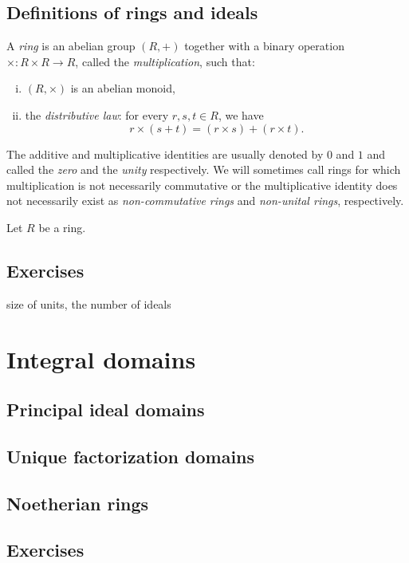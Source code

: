 \documentclass{../../large}
\begin{document}
\section{Definitions of rings and ideals}
\begin{prb}
A \emph{ring} is an abelian group $(R,+)$ together with a binary operation $\times:R\times R\to R$, called the \emph{multiplication}, such that:
\begin{enumerate}[(i)]
\item $(R,\times)$ is an abelian monoid,
\item the \emph{distributive law}: for every $r,s,t\in R$, we have
\[r\times(s+t)=(r\times s)+(r\times t).\]
\end{enumerate}
The additive and multiplicative identities are usually denoted by $0$ and $1$ and called the \emph{zero} and the \emph{unity} respectively.
We will sometimes call rings for which multiplication is not necessarily commutative or the multiplicative identity does not necessarily exist as \emph{non-commutative rings} and \emph{non-unital rings}, respectively.
\end{prb}


\begin{prb}
Let $R$ be a ring.
\end{prb}


\section*{Exercises}
size of units, the number of ideals




\chapter{Integral domains}
\section{Principal ideal domains}
\section{Unique factorization domains}
\section{Noetherian rings}

\section*{Exercises}
\end{document}
